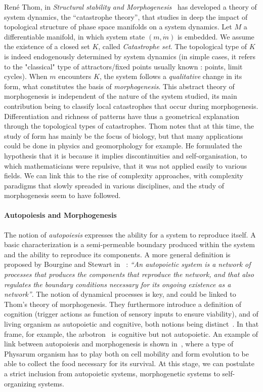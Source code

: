 \documentclass[fleqn,10pt]{wlscirep}
\begin{document}
Ren{\'e} Thom, in \emph{Structural stability and Morphogenesis}~\cite{thom1974stabilite} has developed a theory of system dynamics, the ``catastrophe theory'', that studies in deep the impact of topological structure of phase space manifolds on a system dynamics. Let $M$ a differentiable manifold, in which system state $(m,\dot{m})$ is embedded. We assume the existence of a closed set $K$, called \emph{Catastrophe set}. The topological type of $K$ is indeed endogenously determined by system dynamics (in simple cases, it refers to the "classical" type of attractors/fixed points usually known : points, limit cycles). When $m$ encounters $K$, the system follows a \emph{qualitative} change in its form, what constitutes the basis of \emph{morphogenesis}. This abstract theory of morphogenesis is independent of the nature of the system studied, its main contribution being to classify local catastrophes that occur during morphogenesis. Differentiation and richness of patterns have thus a geometrical explanation through the topological types of catastrophes. Thom notes that at this time, the study of form has mainly be the focus of biology, but that many applications could be done in physics and geomorphology for example. He formulated the hypothesis that it is because it implies discontinuities and self-organisation, to which mathematicians were repulsive, that it was not applied easily to various fields. We can link this to the rise of complexity approaches, with complexity paradigms that slowly spreaded in various disciplines, and the study of morphogenesis seem to have followed.


\paragraph{Autopoiesis and Morphogenesis}

The notion of \emph{autopoiesis} expresses the ability for a system to reproduce itself. A basic characterization is a semi-permeable boundary produced within the system and the ability to reproduce its components. A more general definition is proposed by Bourgine and Stewart in~\cite{bourgine2004autopoiesis} : \textit{``An autopoietic system is a network of processes that produces the components that reproduce the network, and that also regulates the boundary conditions necessary for its ongoing existence as a network''}. The notion of dynamical processes is key, and could be linked to Thom's theory of morphogenesis. They furthermore introduce a definition of cognition (trigger actions as function of sensory inputs to ensure viability), and of living organism as autopoietic and cognitive, both notions being distinct~\cite{bitbol2004autopoiesis}. In that frame, for example, the arbotron~\cite{jun2005formation} is cognitive but not autopoietic. An example of link between autopoiesis and morphogenesis is shown in~\cite{niizato2010model}, where a type of Physarum organism has to play both on cell mobility and form evolution to be able to collect the food necessary for its survival. At this stage, we can postulate a strict inclusion from autopoietic systems, morphogenetic systems to self-organizing systems.
\end{document}
